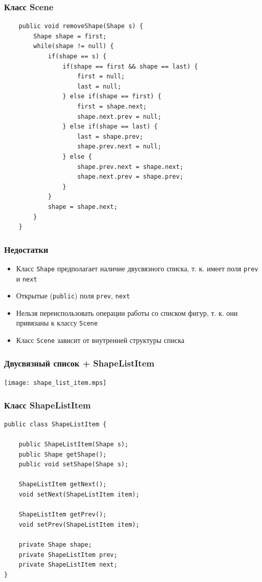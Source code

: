 \documentclass[handout]{beamer}
\begin{document}
\begin{frame}[fragile]
\frametitle{Класс Scene}
\begin{lstlisting}
    public void removeShape(Shape s) {
        Shape shape = first;
        while(shape != null) {
            if(shape == s) {
                if(shape == first && shape == last) {
                    first = null;
                    last = null;
                } else if(shape == first) {
                    first = shape.next;
                    shape.next.prev = null;
                } else if(shape == last) {
                    last = shape.prev;
                    shape.prev.next = null;
                } else {
                    shape.prev.next = shape.next;
                    shape.next.prev = shape.prev;
                }
            }
            shape = shape.next;
        }
    }
\end{lstlisting}
\end{frame}


\begin{frame}[fragile]
\frametitle{Недостатки}
\begin{itemize}
\item Класс \lstinline{Shape} предполагает наличие двусвязного списка,
      т. к. имеет поля \lstinline{prev} и \lstinline{next}
\item Открытые (\lstinline{public}) поля \lstinline{prev}, \lstinline{next}
\item Нельзя переиспользовать операции работы со списком фигур,
      т. к. они привязаны к классу \lstinline{Scene}
\item Класс \lstinline{Scene} зависит от внутренней структуры списка
\end{itemize}
\end{frame}


\begin{frame}[fragile]
\frametitle{Двусвязный список + ShapeListItem}
\begin{center}
\texttt{[image: shape\_list\_item.mps]}
\end{center}
\end{frame}


\begin{frame}[fragile]
\frametitle{Класс ShapeListItem}
\begin{lstlisting}
public class ShapeListItem {

    public ShapeListItem(Shape s);
    public Shape getShape();
    public void setShape(Shape s);

    ShapeListItem getNext();
    void setNext(ShapeListItem item);

    ShapeListItem getPrev();
    void setPrev(ShapeListItem item);

    private Shape shape;
    private ShapeListItem prev;
    private ShapeListItem next;
}
\end{lstlisting}
\end{frame}
\end{document}
